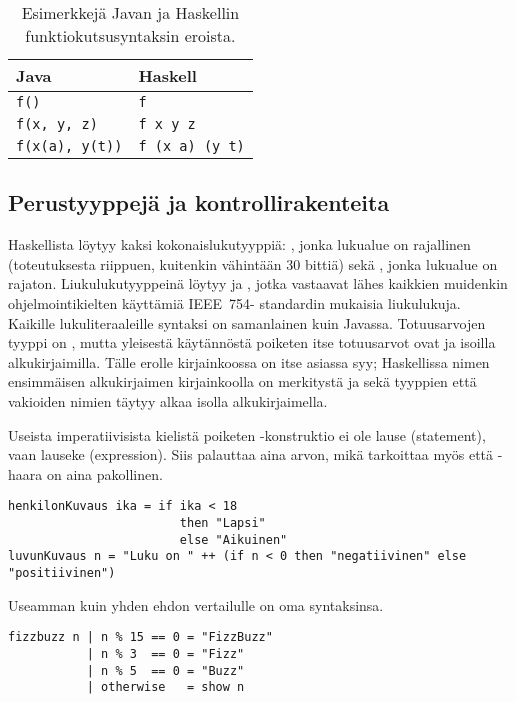 \begin{table}
    \begin{tabular}[H]{l|l}
        Java                    &   Haskell         \\
        \hline
        \texttt{f()}            &   \texttt{f}              \\
        \texttt{f(x, y, z)}     &   \texttt{f x y z}        \\
        \texttt{f(x(a), y(t))}  &   \texttt{f (x a) (y t)}  \\
    \end{tabular}
    \label{tbl:function-call-examples}
    \caption{Esimerkkejä Javan ja Haskellin funktiokutsusyntaksin eroista.}
\end{table}

\subsection{Perustyyppejä ja kontrollirakenteita}
Haskellista löytyy kaksi kokonaislukutyyppiä: ,
jonka lukualue on rajallinen (toteutuksesta riippuen, kuitenkin vähintään 30 bittiä)
sekä ,
jonka lukualue on rajaton.
Liukulukutyyppeinä löytyy  ja ,
jotka vastaavat lähes kaikkien muidenkin ohjelmointikielten käyttämiä IEEE~754- standardin mukaisia liukulukuja.
Kaikille lukuliteraaleille syntaksi on samanlainen kuin Javassa.
Totuusarvojen tyyppi on ,
mutta yleisestä käytännöstä poiketen itse totuusarvot ovat  ja  isoilla alkukirjaimilla.
Tälle erolle kirjainkoossa on itse asiassa syy; Haskellissa nimen ensimmäisen alkukirjaimen kirjainkoolla on merkitystä
ja sekä tyyppien että vakioiden nimien täytyy alkaa isolla alkukirjaimella.

Useista imperatiivisista kielistä poiketen -konstruktio ei ole lause (statement),
vaan lauseke (expression).
Siis  palauttaa aina arvon, mikä tarkoittaa myös että -haara on aina pakollinen.

\begin{verbatim}
henkilonKuvaus ika = if ika < 18
                        then "Lapsi"
                        else "Aikuinen"
luvunKuvaus n = "Luku on " ++ (if n < 0 then "negatiivinen" else "positiivinen")
\end{verbatim}

Useamman kuin yhden ehdon vertailulle on oma syntaksinsa.

\begin{verbatim}
fizzbuzz n | n % 15 == 0 = "FizzBuzz"
           | n % 3  == 0 = "Fizz"
           | n % 5  == 0 = "Buzz"
           | otherwise   = show n
\end{verbatim}

